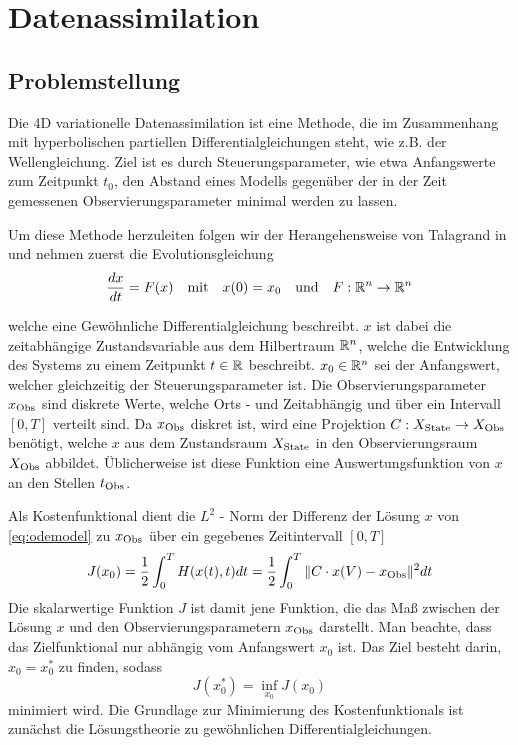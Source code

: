 \chapter{Datenassimilation}
\section{Problemstellung}
Die 4D variationelle Datenassimilation ist eine Methode, die im Zusammenhang mit hyperbolischen partiellen Differentialgleichungen steht, wie z.B. der Wellengleichung. Ziel ist es durch Steuerungsparameter, wie etwa Anfangswerte zum Zeitpunkt $t_0$, den Abstand eines Modells gegenüber der in der Zeit gemessenen Observierungsparameter minimal werden zu lassen. 

Um diese Methode herzuleiten folgen wir der Herangehensweise von Talagrand in \cite{talagrand1987variational} und nehmen zuerst die Evolutionsgleichung
\begin{equation}
\label{eq:odemodel}
 \frac{dx}{dt} = F(x)\quad \text{mit} \quad x(0) = x_0 \quad \text{und}\quad F:\mathbb{R}^n\to \mathbb{R}^n
\end{equation}
  
welche eine Gewöhnliche Differentialgleichung beschreibt. $x$ ist dabei die zeitabhängige Zustandsvariable aus dem Hilbertraum $\mathbb{R}^n$, welche die Entwicklung des Systems zu einem Zeitpunkt $t\in \mathbb{R}$ beschreibt. 
$x_0 \in \mathbb{R}^n$ sei der Anfangswert, welcher gleichzeitig der Steuerungsparameter ist.
Die Observierungsparameter $x_{\text{Obs}}$ sind diskrete Werte, welche Orts - und Zeitabhängig und über ein Intervall $[0,T]$ verteilt sind. Da $x_{\text{Obs}}$ diskret ist, wird eine Projektion $C:X_{\text{State}}\to X_{\text{Obs}}$ benötigt, welche $x$ aus dem Zustandsraum $X_{\text{State}}$ in den Observierungsraum $X_{\text{Obs}}$ abbildet. Üblicherweise ist diese Funktion eine Auswertungsfunktion von $x$ an den Stellen $t_{\text{Obs}}$.

Als Kostenfunktional dient die $L^2$ - Norm der Differenz der Lösung $x$ von \eqref{eq:odemodel} zu $x_{\text{Obs}}$ über ein gegebenes Zeitintervall $[0,T]$
\begin{equation}
\label{eq:costfunctional}
 J(x_0) = \frac{1}{2}\int_0^T H(x(t),t)dt= \frac{1}{2}\int_0^T \|C\cdot x(V)-x_{\text{Obs}}\|^2dt
\end{equation}
Die skalarwertige Funktion $J$ ist damit jene Funktion, die das Maß zwischen der Lösung $x$ und den Observierungsparametern $x_{\text{Obs}}$ darstellt.
Man beachte, dass das Zielfunktional nur abhängig vom Anfangswert $x_0$ ist. Das Ziel besteht darin, $x_0 = x_0^*$ zu finden, sodass
\[
 J(x_0^*) = \inf_{x_0} J(x_0) 
\]
minimiert wird. Die Grundlage zur Minimierung des Kostenfunktionals ist zunächst die Lösungstheorie zu gewöhnlichen Differentialgleichungen.

